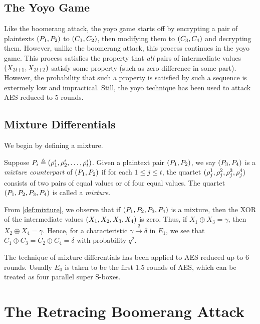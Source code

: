 \documentclass[twoside]{article}
\begin{document}
\subsection{The Yoyo Game}

Like the boomerang attack, the yoyo game starts off by encrypting a pair of
plaintexts \((P_1, P_2)\) to \((C_1, C_2)\), then modifying them to
\((C_3, C_4)\) and decrypting them. However, unlike the boomerang attack,
this process continues in the yoyo game. This process satisfies the property
that \emph{all} pairs of intermediate values \((X_{2l + 1}, X_{2l + 2})\)
satisfy some property (such as zero difference in some part). However, the
probability that such a property is satisfied by such a sequence is extermely
low and impractical. Still, the yoyo technique has been used to attack AES
reduced to 5 rounds.

\subsection{Mixture Differentials}

We begin by defining a mixture.

\begin{definition}[Mixture]
    \label{def:mixture}
    Suppose \(P_i \triangleq (\rho_1^i, \rho_2^i, \ldots, \rho_t^i)\).
    Given a plaintext pair \((P_1, P_2)\), we say \((P_3, P_4)\) is a
    \emph{mixture counterpart} of \((P_1, P_2)\) if for each \(1 \le j \le
    t\), the quartet \((\rho_j^1, \rho_j^2, \rho_j^3, \rho_j^4)\) consists
    of two pairs of equal values or of four equal values. The quartet
    \((P_1, P_2, P_3, P_4)\) is called a \emph{mixture}.
\end{definition}

From \autoref{def:mixture}, we observe that if \((P_1, P_2, P_3, P_4)\) is
a mixture, then the XOR of the intermediate values \((X_1, X_2, X_3, X_4)\)
is zero. Thus, if \(X_1 \oplus X_3 = \gamma\), then \(X_2 \oplus X_4 = \gamma\).
Hence, for a characteristic \(\gamma \xrightarrow{q} \delta\) in \(E_1\), we see
that \(C_1 \oplus C_3 = C_2 \oplus C_4 = \delta\) with probability \(q^2\).

The technique of mixture differentials has been applied to AES reduced up to 6
rounds. Usually \(E_0\) is taken to be the first 1.5 rounds of AES, which can be
treated as four parallel super S-boxes.

\section{The Retracing Boomerang Attack}
\end{document}
